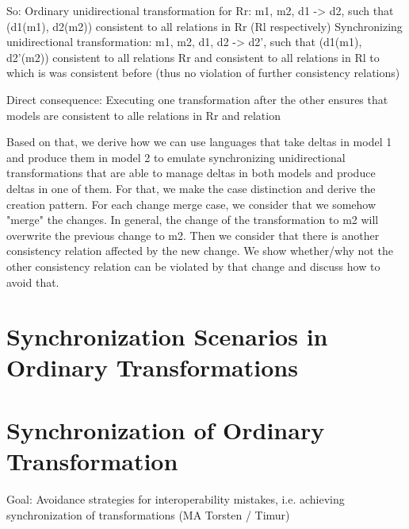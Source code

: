So:
Ordinary unidirectional transformation for Rr: m1, m2, d1 -> d2, such that (d1(m1), d2(m2)) consistent to all relations in Rr (Rl respectively)
Synchronizing unidirectional transformation: m1, m2, d1, d2 -> d2', such that (d1(m1), d2'(m2)) consistent to all relations Rr and consistent to all relations in Rl to which is was consistent before (thus no violation of further consistency relations)

Direct consequence: Executing one transformation after the other ensures that models are consistent to alle relations in Rr and relation

Based on that, we derive how we can use languages that take deltas in model 1 and produce them in model 2 to emulate synchronizing unidirectional transformations that are able to manage deltas in both models and produce deltas in one of them.
For that, we make the case distinction and derive the creation pattern.
For each change merge case, we consider that we somehow "merge" the changes. In general, the change of the transformation to m2 will overwrite the previous change to m2. Then we consider that there is another consistency relation affected by the new change. We show whether/why not the other consistency relation can be violated by that change and discuss how to avoid that.




\section{Synchronization Scenarios in Ordinary Transformations}





\section{Synchronization of Ordinary Transformation}
Goal: Avoidance strategies for interoperability mistakes, i.e. achieving synchronization of transformations (MA Torsten / Timur)
\label{chap:prevention:interoperability}


